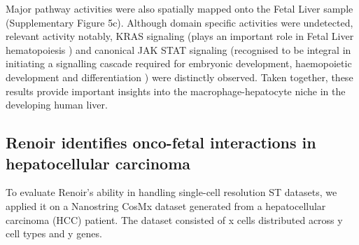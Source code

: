Major pathway activities were also spatially mapped onto the Fetal Liver sample (Supplementary Figure 5c). Although domain specific activities were undetected, relevant activity notably, KRAS signaling (plays an important role in Fetal Liver hematopoiesis \citep{10.1002/stem.2355}) and canonical JAK STAT signaling (recognised to be integral in initiating a signalling cascade required for embryonic development, haemopoietic development and differentiation \citep{doi:10.3109/08977194.2012.660936}) were distinctly observed. Taken together, these results provide important insights into the macrophage-hepatocyte niche in the developing human liver.

\subsection*{Renoir identifies onco-fetal interactions in hepatocellular carcinoma}
To evaluate Renoir's ability in handling single-cell resolution ST datasets, we applied it on a Nanostring CosMx dataset generated from a hepatocellular carcinoma (HCC) patient. The dataset consisted of x cells distributed across y cell types and y genes. 

